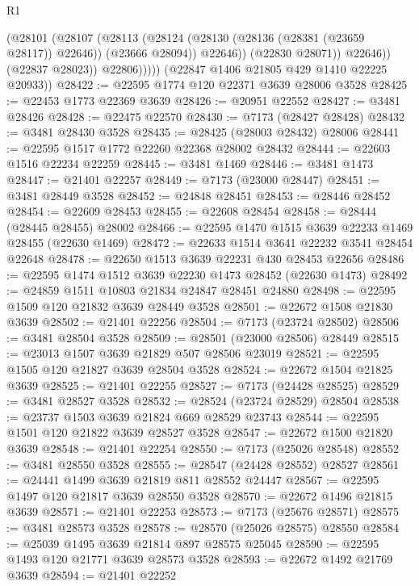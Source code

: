 \begin{lexlean}{R1}
\begin{coremodule}
                      (@28101
                        (@28107
                          (@28113
                            (@28124
                              (@28130 (@28136 (@28381 (@23659 @28117)) @22646))
                              (@23666 @28094))
                            @22646))
                        (@22830 @28071))
                      @22646))
                  (@22837 @28023))
                @22806)))))
      (@22847 @1406 @21805 @429 @1410 @22225 @20933))
@28422 := @22595 @1774 @120 @22371 @3639 @28006 @3528
@28425 := @22453 @1773 @22369 @3639
@28426 := @20951 @22552
@28427 := @3481 @28426
@28428 := @22475 @22570
@28430 := @7173 (@28427 @28428)
@28432 := @3481 @28430 @3528
@28435 := @28425 (@28003 @28432) @28006
@28441 := @22595 @1517 @1772 @22260 @22368 @28002 @28432
@28444 := @22603 @1516 @22234 @22259
@28445 := @3481 @1469
@28446 := @3481 @1473
@28447 := @21401 @22257
@28449 := @7173 (@23000 @28447)
@28451 := @3481 @28449 @3528
@28452 := @24848 @28451
@28453 := @28446 @28452
@28454 := @22609 @28453
@28455 := @22608 @28454
@28458 := @28444 (@28445 @28455) @28002
@28466 := @22595 @1470 @1515 @3639 @22233 @1469 @28455 (@22630 @1469)
@28472 := @22633 @1514 @3641 @22232 @3541 @28454 @22648
@28478 := @22650 @1513 @3639 @22231 @430 @28453 @22656
@28486 := @22595 @1474 @1512 @3639 @22230 @1473 @28452 (@22630 @1473)
@28492 := @24859 @1511 @10803 @21834 @24847 @28451 @24880
@28498 := @22595 @1509 @120 @21832 @3639 @28449 @3528
@28501 := @22672 @1508 @21830 @3639
@28502 := @21401 @22256
@28504 := @7173 (@23724 @28502)
@28506 := @3481 @28504 @3528
@28509 := @28501 (@23000 @28506) @28449
@28515 := @23013 @1507 @3639 @21829 @507 @28506 @23019
@28521 := @22595 @1505 @120 @21827 @3639 @28504 @3528
@28524 := @22672 @1504 @21825 @3639
@28525 := @21401 @22255
@28527 := @7173 (@24428 @28525)
@28529 := @3481 @28527 @3528
@28532 := @28524 (@23724 @28529) @28504
@28538 := @23737 @1503 @3639 @21824 @669 @28529 @23743
@28544 := @22595 @1501 @120 @21822 @3639 @28527 @3528
@28547 := @22672 @1500 @21820 @3639
@28548 := @21401 @22254
@28550 := @7173 (@25026 @28548)
@28552 := @3481 @28550 @3528
@28555 := @28547 (@24428 @28552) @28527
@28561 := @24441 @1499 @3639 @21819 @811 @28552 @24447
@28567 := @22595 @1497 @120 @21817 @3639 @28550 @3528
@28570 := @22672 @1496 @21815 @3639
@28571 := @21401 @22253
@28573 := @7173 (@25676 @28571)
@28575 := @3481 @28573 @3528
@28578 := @28570 (@25026 @28575) @28550
@28584 := @25039 @1495 @3639 @21814 @897 @28575 @25045
@28590 := @22595 @1493 @120 @21771 @3639 @28573 @3528
@28593 := @22672 @1492 @21769 @3639
@28594 := @21401 @22252

\end{coremodule}
\end{lexlean}
